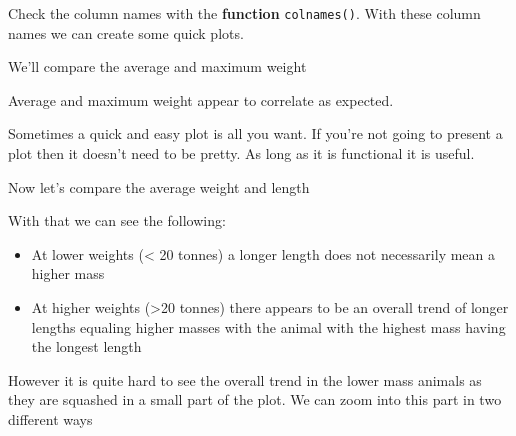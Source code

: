 \documentclass[]{book}
\newenvironment{Shaded}{\begin{snugshade}}{\end{snugshade}}
\newcommand{\KeywordTok}[1]{\textcolor[rgb]{0.13,0.29,0.53}{\textbf{#1}}}
\newcommand{\DataTypeTok}[1]{\textcolor[rgb]{0.13,0.29,0.53}{#1}}
\newcommand{\StringTok}[1]{\textcolor[rgb]{0.31,0.60,0.02}{#1}}
\newcommand{\OperatorTok}[1]{\textcolor[rgb]{0.81,0.36,0.00}{\textbf{#1}}}
\newcommand{\NormalTok}[1]{#1}
\providecommand{\tightlist}{%
  \setlength{\itemsep}{0pt}\setlength{\parskip}{0pt}}
\begin{document}
Check the column names with the \textbf{function} \texttt{colnames()}.
With these column names we can create some quick plots.

We'll compare the average and maximum weight

\begin{Shaded}
\end{Shaded}

Average and maximum weight appear to correlate as expected.

Sometimes a quick and easy plot is all you want. If you're not going to
present a plot then it doesn't need to be pretty. As long as it is
functional it is useful.

Now let's compare the average weight and length

\begin{Shaded}
\end{Shaded}

With that we can see the following:

\begin{itemize}
\tightlist
\item
  At lower weights (\textless{} 20 tonnes) a longer length does not
  necessarily mean a higher mass
\item
  At higher weights (\textgreater{}20 tonnes) there appears to be an
  overall trend of longer lengths equaling higher masses with the animal
  with the highest mass having the longest length
\end{itemize}

However it is quite hard to see the overall trend in the lower mass
animals as they are squashed in a small part of the plot. We can zoom
into this part in two different ways
\end{document}
